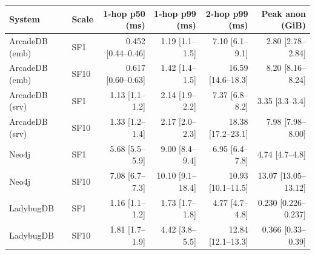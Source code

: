 \begin{tabular}{llrrrr}
\toprule
System & Scale & 1-hop p50 (ms) & 1-hop p99 (ms) & 2-hop p99 (ms) & Peak anon (GiB) \\
\midrule
ArcadeDB (emb) & SF1 & 0.452 [0.44--0.46] & 1.19 [1.1--1.5] & 7.10 [6.1--9.1] & 2.80 [2.78--2.84] \\
ArcadeDB (emb) & SF10 & 0.617 [0.60--0.63] & 1.42 [1.4--1.5] & 16.59 [14.6--18.3] & 8.20 [8.16--8.24] \\
ArcadeDB (srv) & SF1 & 1.13 [1.1--1.2] & 2.14 [1.9--2.2] & 7.37 [6.8--8.2] & 3.35 [3.3--3.4] \\
ArcadeDB (srv) & SF10 & 1.33 [1.2--1.4] & 2.17 [2.0--2.3] & 18.38 [17.2--23.1] & 7.98 [7.98--8.00] \\
Neo4j & SF1 & 5.68 [5.5--5.9] & 9.00 [8.4--9.4] & 6.95 [6.4--7.8] & 4.74 [4.7--4.8] \\
Neo4j & SF10 & 7.08 [6.7--7.3] & 10.10 [9.1--18.4] & 10.93 [10.1--11.5] & 13.07 [13.05--13.12] \\
LadybugDB & SF1 & 1.16 [1.1--1.2] & 1.73 [1.7--1.8] & 4.77 [4.7--4.8] & 0.230 [0.226--0.237] \\
LadybugDB & SF10 & 1.81 [1.7--1.9] & 4.42 [3.8--5.5] & 12.84 [12.1--13.3] & 0.366 [0.33--0.39] \\
\bottomrule
\end{tabular}
